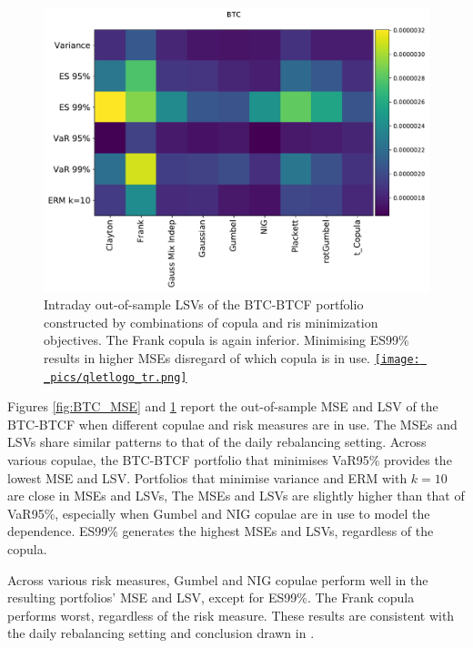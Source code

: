 \documentclass[11pt,a4paper,english]{article}
\providecommand{\natp}[1]{\textcolor{darkorange}{#1}}
\begin{document}
\begin{figure}[t]
  \begin{center}
    \includegraphics[width=.65\textwidth]{_pics/intraday_BTC_LSVs.pdf}
  \end{center}
  \caption{Intraday out-of-sample LSVs of the BTC-BTCF portfolio constructed by combinations of copula and ris minimization objectives.
    The Frank copula is again inferior. Minimising ES99\% results in higher MSEs disregard of which copula is in use.
  \href{https://github.com/QuantLet/Hedging-Cryptos-with-Bitcoin-Futures/blob/main/newToQuantlet/Pynotebooks/figures/intraday/gen_MSEs_LSVs.ipynb}{\texttt{[image: \_pics/qletlogo\_tr.png]}} }
\label{fig:BTC_LSV}
\end{figure}

Figures \ref{fig:BTC_MSE} and \ref{fig:BTC_LSV} report the
out-of-sample MSE and LSV of the BTC-BTCF when different copulae and
risk measures are in use. The MSEs and LSVs share similar patterns to that of the daily rebalancing
setting. 
Across various copulae, the BTC-BTCF portfolio that minimises VaR95\%
provides the lowest MSE and LSV. 
Portfolios that minimise variance and ERM with $k=10$ are close in MSEs and LSVs,
The MSEs and LSVs are slightly higher than that of VaR95\%, especially when Gumbel and NIG copulae
are in use to model the dependence. ES99\% generates the highest MSEs
and LSVs, regardless of the copula. 

Across various risk measures, Gumbel and NIG copulae perform
well in the resulting portfolios’ MSE and LSV, except for
ES99\%. 
The Frank copula performs worst, regardless of the risk measure. 
These results are consistent with the daily rebalancing setting and
conclusion drawn in \citet[p.667]{barbi2014copula}. 
\end{document}
